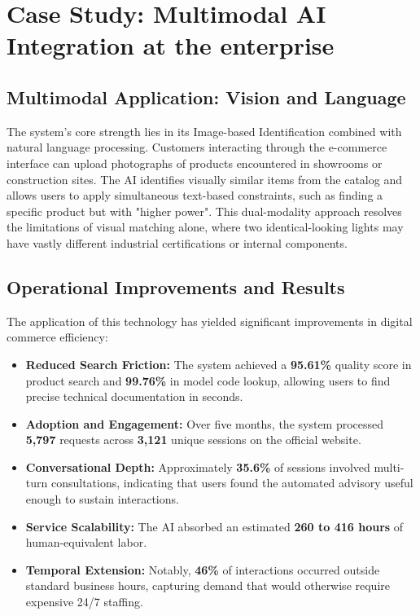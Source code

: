 \section{Case Study: Multimodal AI Integration at the enterprise}

\subsection{Multimodal Application: Vision and Language}

The system’s core strength lies in its Image-based Identification combined with natural language processing. Customers interacting through the e-commerce interface can upload photographs of products encountered in showrooms or construction sites. The AI identifies visually similar items from the catalog and allows users to apply simultaneous text-based constraints, such as finding a specific product but with "higher power". This dual-modality approach resolves the limitations of visual matching alone, where two identical-looking lights may have vastly different industrial certifications or internal components.

\subsection{Operational Improvements and Results}

The application of this technology has yielded significant improvements in digital commerce efficiency:
\begin{itemize}
    \item \textbf{Reduced Search Friction:} The system achieved a \textbf{95.61\%} quality score in product search and \textbf{99.76\%} in model code lookup, allowing users to find precise technical documentation in seconds.
    
    \item \textbf{Adoption and Engagement:} Over five months, the system processed \textbf{5,797} requests across \textbf{3,121} unique sessions on the official website.
    
    \item \textbf{Conversational Depth:} Approximately \textbf{35.6\%} of sessions involved multi-turn consultations, indicating that users found the automated advisory useful enough to sustain interactions.
    
    \item \textbf{Service Scalability:} The AI absorbed an estimated \textbf{260 to 416 hours} of human-equivalent labor.
    
    \item \textbf{Temporal Extension:} Notably, \textbf{46\%} of interactions occurred outside standard business hours, capturing demand that would otherwise require expensive 24/7 staffing.
\end{itemize}